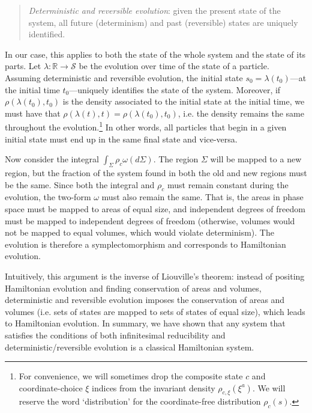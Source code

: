 \documentclass[12pt, english, twoside]{article} %
\newcommand\bs{\begin{singlespace}}
\newcommand\es{\end{singlespace}}
\begin{document}
\begin{quotation}
\bs
\noindent
\textit{Deterministic and reversible evolution}: given the present state of the system, all future (determinism) and past (reversible) states are uniquely identified. \es
\end{quotation}

In our case, this applies to both the state of the whole system and the state of its parts. Let $\lambda: \mathbb{R} \to \mathcal{S}$ be the evolution over time of the state of a particle. Assuming deterministic and reversible evolution, the initial state $s_0 = \lambda(t_0)$---at the initial time $t_0$---uniquely identifies the state of the system. Moreover, if $\rho(\lambda(t_0), t_0)$ is the density associated to the initial state at the initial time, we must have that $\rho(\lambda(t), t) = \rho(\lambda(t_0), t_0)$, i.e. the density remains the same throughout the evolution.\footnote{For convenience, we will sometimes drop the composite state $c$ and coordinate-choice $\xi$ indices from the invariant density $\rho_{c, \xi} (\xi^a)$. We will reserve the word `distribution' for the coordinate-free distribution $\rho_c (s)$. } In other words, all particles that begin in a given initial state must end up in the same final state and vice-versa.  

Now consider the integral $\int_{\Sigma} \rho_c \omega(d\Sigma)$. The region $\Sigma$ will be mapped to a new region, but the fraction of the system found in both the old and new regions must be the same. Since both the integral and $\rho_c$ must remain constant during the evolution, the two-form $\omega$ must also remain the same. That is, the areas in phase space must be mapped to areas of equal size, and independent degrees of freedom must be mapped to independent degrees of freedom (otherwise, volumes would not be mapped to equal volumes, which would violate determinism). The evolution is therefore a symplectomorphism and corresponds to Hamiltonian evolution. 

Intuitively, this argument is the inverse of Liouville's theorem: instead of positing Hamiltonian evolution and finding conservation of areas and volumes, deterministic and reversible evolution imposes the conservation of areas and volumes (i.e. sets of states are mapped to sets of states of equal size), which leads to Hamiltonian evolution. In summary, we have shown that any system that satisfies the conditions of both infinitesimal reducibility and deterministic/reversible evolution is a classical Hamiltonian system.
\end{document}
